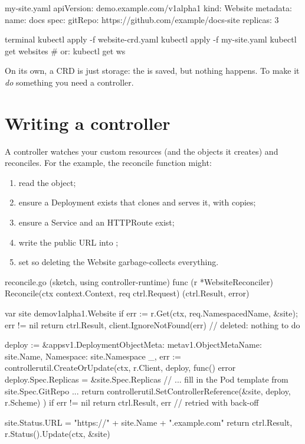 \begin{yamlcode}{my-site.yaml}
apiVersion: demo.example.com/v1alpha1
kind: Website
metadata:
  name: docs
spec:
  gitRepo: https://github.com/example/docs-site
  replicas: 3
\end{yamlcode}

\begin{bashcode}{terminal}
kubectl apply -f website-crd.yaml
kubectl apply -f my-site.yaml
kubectl get websites          # or: kubectl get ws
\end{bashcode}

On its own, a CRD is just storage: the  is saved, but nothing
happens. To make it \emph{do} something you need a controller.

\section{Writing a controller}

A controller watches your custom resources (and the objects it creates) and
reconciles. For the  example, the reconcile function might:

\begin{enumerate}
  \item read the  object;
  \item ensure a Deployment exists that clones  and serves it, with
         copies;
  \item ensure a Service and an HTTPRoute exist;
  \item write the public URL into ;
  \item set  so deleting the Website garbage-collects everything.
\end{enumerate}

\begin{plaincode}{reconcile.go (sketch, using controller-runtime)}
func (r *WebsiteReconciler) Reconcile(ctx context.Context, req ctrl.Request) (ctrl.Result, error) {
    var site demov1alpha1.Website
    if err := r.Get(ctx, req.NamespacedName, &site); err != nil {
        return ctrl.Result{}, client.IgnoreNotFound(err)   // deleted: nothing to do
    }

    deploy := &appsv1.Deployment{ObjectMeta: metav1.ObjectMeta{Name: site.Name, Namespace: site.Namespace}}
    _, err := controllerutil.CreateOrUpdate(ctx, r.Client, deploy, func() error {
        deploy.Spec.Replicas = &site.Spec.Replicas
        // ... fill in the Pod template from site.Spec.GitRepo ...
        return controllerutil.SetControllerReference(&site, deploy, r.Scheme)
    })
    if err != nil {
        return ctrl.Result{}, err                          // retried with back-off
    }

    site.Status.URL = "https://" + site.Name + ".example.com"
    return ctrl.Result{}, r.Status().Update(ctx, &site)
}
\end{plaincode}

